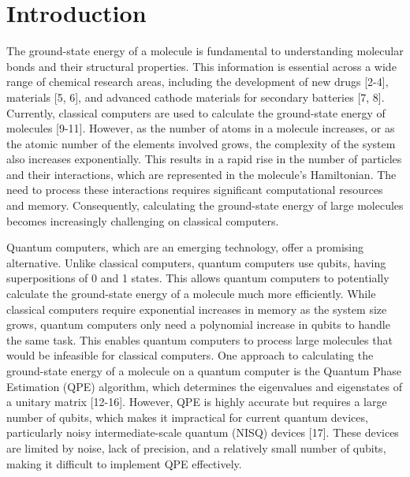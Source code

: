 \documentclass[pdflatex,sn-mathphys-num]{sn-jnl}%
\theoremstyle{thmstyleone}%
\theoremstyle{thmstyletwo}%
\theoremstyle{thmstylethree}%
\begin{document}
\section{Introduction}\label{sec1}

The ground-state energy of a molecule is fundamental to understanding molecular bonds and their structural properties. 
This information is essential across a wide range of chemical research areas, including the development of new drugs [2-4], materials [5, 6], and advanced cathode materials for secondary batteries [7, 8]. 
Currently, classical computers are used to calculate the ground-state energy of molecules [9-11].
However, as the number of atoms in a molecule increases, or as the atomic number of the elements involved grows, the complexity of the system also increases exponentially.
This results in a rapid rise in the number of particles and their interactions, which are represented in the molecule’s Hamiltonian. 
The need to process these interactions requires significant computational resources and memory. 
Consequently, calculating the ground-state energy of large molecules becomes increasingly challenging on classical computers.

Quantum computers, which are an emerging technology, offer a promising alternative. Unlike classical computers, quantum computers use qubits, having superpositions of  0 and 1 states. 
This allows quantum computers to potentially calculate the ground-state energy of a molecule much more efficiently. 
While classical computers require exponential increases in memory as the system size grows, quantum computers only need a polynomial increase in qubits to handle the same task. 
This enables quantum computers to process large molecules that would be infeasible for classical computers.
One approach to calculating the ground-state energy of a molecule on a quantum computer is the Quantum Phase Estimation (QPE) algorithm, which determines the eigenvalues and eigenstates of a unitary matrix [12-16]. 
However, QPE is highly accurate but requires a large number of qubits, which makes it impractical for current quantum devices, particularly noisy intermediate-scale quantum (NISQ) devices [17]. 
These devices are limited by noise, lack of precision, and a relatively small number of qubits, making it difficult to implement QPE effectively.
\end{document}
